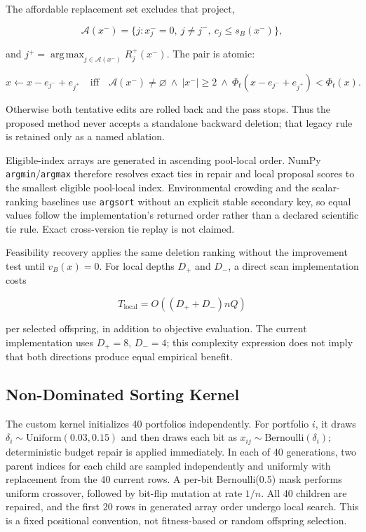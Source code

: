 \documentclass[applsci,article,submit,moreauthors]{Definitions/mdpi}
\begin{document}
The affordable replacement set excludes that project,

\[
\mathcal A(x^-)=\{j:x^-_j=0,\ j\neq j^-,\ c_j\leq s_B(x^-)\},
\]

and \(j^+=\operatorname*{arg\,max}_{j\in\mathcal A(x^-)}R_j^+(x^-)\). The pair is atomic:

\[
x\leftarrow x-e_{j^-}+e_{j^+}
\quad\text{iff}\quad
\mathcal A(x^-)\neq\varnothing\ \land\ |x^-|\geq2\ \land\
\Phi_t(x-e_{j^-}+e_{j^+})<\Phi_t(x).
\]

Otherwise both tentative edits are rolled back and the pass stops. Thus the proposed method never accepts a standalone backward deletion; that legacy rule is retained only as a named ablation.

Eligible-index arrays are generated in ascending pool-local order. NumPy \texttt{argmin}/\texttt{argmax} therefore resolves exact ties in repair and local proposal scores to the smallest eligible pool-local index. Environmental crowding and the scalar-ranking baselines use \texttt{argsort} without an explicit stable secondary key, so equal values follow the implementation's returned order rather than a declared scientific tie rule. Exact cross-version tie replay is not claimed.

Feasibility recovery applies the same deletion ranking without the improvement test until \(v_B(x)=0\). For local depths \(D_+\) and \(D_-\), a direct scan implementation costs

\[
T_{\mathrm{local}}=O\!\left((D_++D_-)nQ\right)
\]

per selected offspring, in addition to objective evaluation. The current implementation uses \(D_+=8\), \(D_-=4\); this complexity expression does not imply that both directions produce equal empirical benefit.

\subsection{Non-Dominated Sorting Kernel}\label{non-dominated-sorting-kernel}

The custom kernel initializes 40 portfolios independently. For portfolio \(i\), it draws \(\delta_i\sim\mathrm{Uniform}(0.03,0.15)\) and then draws each bit as \(x_{ij}\sim\mathrm{Bernoulli}(\delta_i)\); deterministic budget repair is applied immediately. In each of 40 generations, two parent indices for each child are sampled independently and uniformly with replacement from the 40 current rows. A per-bit Bernoulli(0.5) mask performs uniform crossover, followed by bit-flip mutation at rate \(1/n\). All 40 children are repaired, and the first 20 rows in generated array order undergo local search. This is a fixed positional convention, not fitness-based or random offspring selection.
\end{document}

